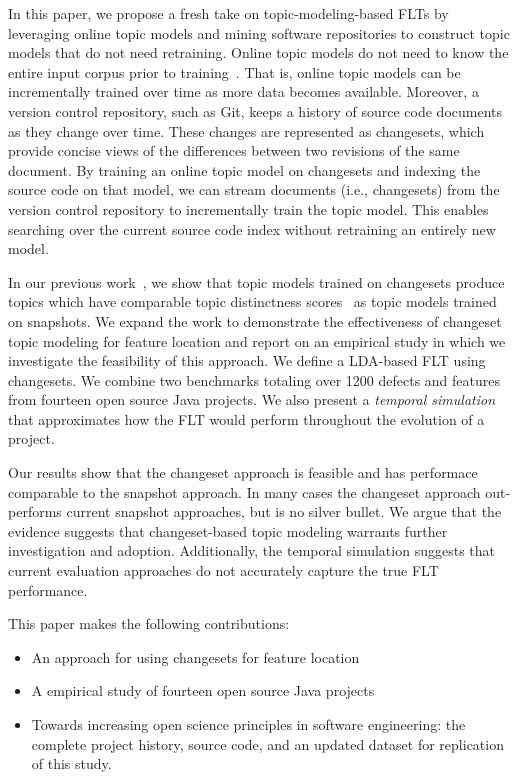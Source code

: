 In this paper, we propose a fresh take on topic-modeling-based FLTs by leveraging online topic models and mining software repositories to construct topic models that do not need retraining.
Online topic models do not need to know the entire input corpus prior to training~\cite{Hoffman-etal:2010,Radim:2011}.
That is, online topic models can be incrementally trained over time as more data becomes available.
Moreover, a version control repository, such as Git, keeps a history of source code documents as they change over time.
These changes are represented as changesets, which provide concise views of the differences between two revisions of the same document.
By training an online topic model on changesets and indexing the source code on that model, we can stream documents (i.e., changesets) from the version control repository to incrementally train the topic model.
This enables searching over the current source code index without retraining an entirely new model.

In our previous work~\cite{Corley-etal:2014}, we show that topic models trained on changesets produce topics which have comparable
topic distinctness scores~\cite{Thomas-etal:2011} as topic models trained on snapshots.
We expand the work to demonstrate the effectiveness of changeset topic modeling for feature location and report on an empirical study in which we investigate the feasibility of this approach.
We define a LDA-based FLT using changesets.
We combine two benchmarks totaling over 1200 defects and features from fourteen open source Java projects.
We also present a \emph{temporal simulation} that approximates how the FLT would perform throughout the evolution of a project.

Our results show that the changeset approach is feasible and has performace comparable to the snapshot approach.
In many cases the changeset approach out-performs current snapshot approaches, but is no silver bullet.
We argue that the evidence suggests that changeset-based topic modeling warrants further investigation and adoption.
Additionally, the temporal simulation suggests that current evaluation approaches do not accurately capture the true FLT performance.

This paper makes the following contributions:

\begin{itemize}
    \item An approach for using changesets for feature location
    \item A empirical study of fourteen open source Java projects
    \item Towards increasing open science principles in software engineering:
        the complete project history, source code, and an updated dataset for
        replication of this study.
\end{itemize}

